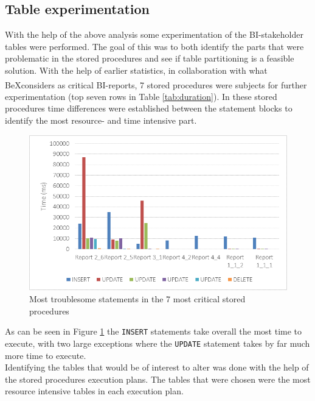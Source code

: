 \documentclass{cslthse-msc}
\newcommand{\bex}{BeX\textsuperscript{\textregistered}}
\begin{document}
\subsection{Table experimentation}
With the help of the above analysis some experimentation of the BI-stakeholder tables were performed. The goal of this was to both identify the parts that were problematic in the stored procedures and see if table partitioning is a feasible solution.
With the help of earlier statistics, in collaboration with what \bex considers as critical BI-reports, 7 stored procedures were subjects for further experimentation (top seven rows in Table \ref{tab:duration}). In these stored procedures time differences were established between the statement blocks to identify the most resource- and time intensive part. 
\begin{figure}[H]
\begin{center}
\includegraphics[scale=1]{Pictures/blocks.png}
\caption{Most troublesome statements in the 7 most critical stored procedures}
\label{time graph}
\end{center}
\end{figure}
\noindent As can be seen in Figure \ref{time graph} the \texttt{INSERT} statements take overall the most time to execute, with two large exceptions where the \texttt{UPDATE} statement takes by far much more time to execute.\\ Identifying the tables that would be of interest to alter was done with the help of the stored procedures execution plans. The tables that were chosen were the most resource intensive tables in each execution plan. 
\end{document}
